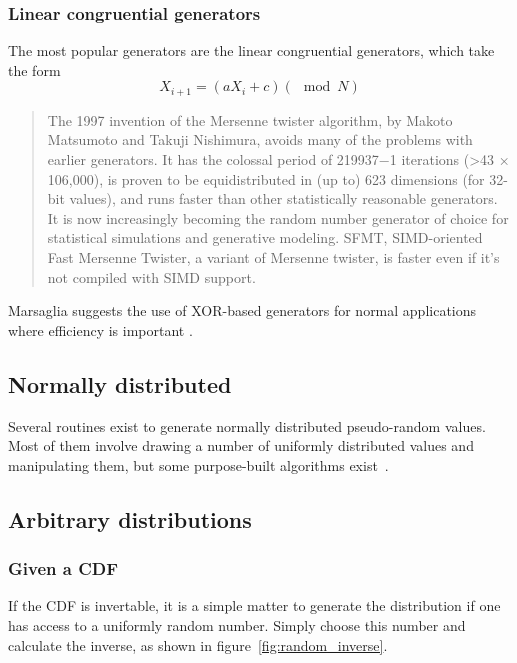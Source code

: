 \subsubsection{Linear congruential generators}
The most popular generators are the linear congruential generators, which take the form \citep[10]{knuth1997art}
\begin{equation}
X_{i+1} = (aX_i +c) (\mod N)
\end{equation}

\begin{quote}
The 1997 invention of the Mersenne twister algorithm, by Makoto Matsumoto and Takuji Nishimura, avoids many of the problems with earlier generators.
It has the colossal period of 219937−1 iterations (>43 × 106,000), is proven to be equidistributed in (up to) 623 dimensions (for 32-bit values), and runs faster than other statistically reasonable generators.
It is now increasingly becoming the random number generator of choice for statistical simulations and generative modeling.
SFMT, SIMD-oriented Fast Mersenne Twister, a variant of Mersenne twister, is faster even if it's not compiled with SIMD support.
\end{quote}

Marsaglia suggests the use of XOR-based generators for normal
applications where efficiency is important \citehere.

\subsection{Normally distributed}
Several routines exist to generate normally distributed pseudo-random values.
Most of them involve drawing a number of uniformly distributed values and manipulating them, but some purpose-built algorithms exist~\citehere.

\subsection{Arbitrary distributions}

\subsubsection{Given a CDF}
If the CDF is invertable, it is a simple matter to generate the distribution if one has access to a uniformly random number.
Simply choose this number and calculate the inverse, as shown in figure~\ref{fig:random_inverse}.

